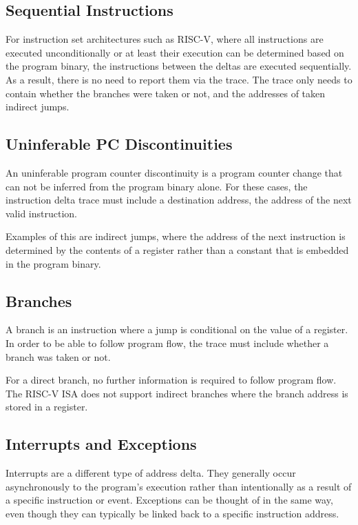 \subsection{Sequential Instructions} \label{Sequential Instructions}

For instruction set architectures such as RISC-V, where all instructions are executed
unconditionally or at least their execution can be determined based on
the program binary, the instructions between the deltas are executed sequentially.
As a result, there is no need to report them via the trace. The trace only
needs to contain whether the branches were taken or not, and the addresses
of taken indirect jumps.

\subsection{Uninferable PC Discontinuities} \label{uninfpc}

An uninferable program counter discontinuity is a program counter change
that can not be inferred from the program binary alone. For these cases,
the instruction delta trace must include a destination address, the
address of the next valid instruction.

Examples of this are indirect jumps, where the address of the
next instruction is determined by the contents of a register
rather than a constant that is embedded in the program binary.

\subsection{Branches} \label{branches}

A branch is an instruction where a jump is conditional on the
value of a register. In order to be able to follow program flow,
the trace must include whether a branch was taken or not.

For a direct branch, no further information is required to follow
program flow. The RISC-V ISA does not support indirect branches
where the branch address is stored in a register.

\subsection{Interrupts and Exceptions} \label{interruptsexceptions}

Interrupts are a different type of address delta. They generally occur
asynchronously to the program's execution rather than intentionally as
a result of a specific instruction or event. Exceptions can be thought
of in the same way, even though they can typically be linked back to a
specific instruction address.

